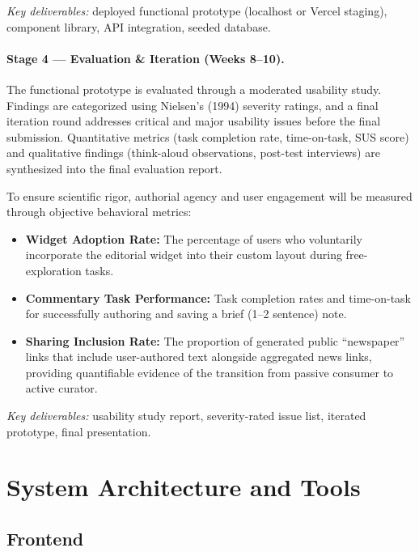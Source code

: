 \documentclass[14pt]{article}
\begin{document}
\noindent\textit{Key deliverables:} deployed functional prototype (localhost or Vercel staging), component library, API integration, seeded database.

\paragraph{Stage 4 --- Evaluation \& Iteration (Weeks 8--10).}
The functional prototype is evaluated through a moderated usability study. Findings are categorized using Nielsen's (1994) severity ratings, and a final iteration round addresses critical and major usability issues before the final submission. Quantitative metrics (task completion rate, time-on-task, SUS score) and qualitative findings (think-aloud observations, post-test interviews) are synthesized into the final evaluation report.

To ensure scientific rigor, authorial agency and user engagement will be measured through objective behavioral metrics:
\begin{itemize}[noitemsep]
    \item \textbf{Widget Adoption Rate:} The percentage of users who voluntarily incorporate the editorial widget into their custom layout during free-exploration tasks.
    \item \textbf{Commentary Task Performance:} Task completion rates and time-on-task for successfully authoring and saving a brief (1--2 sentence) note.
    \item \textbf{Sharing Inclusion Rate:} The proportion of generated public ``newspaper'' links that include user-authored text alongside aggregated news links, providing quantifiable evidence of the transition from passive consumer to active curator.
\end{itemize}

\noindent\textit{Key deliverables:} usability study report, severity-rated issue list, iterated prototype, final presentation.

\section{System Architecture and Tools}

\subsection{Frontend}
\end{document}
